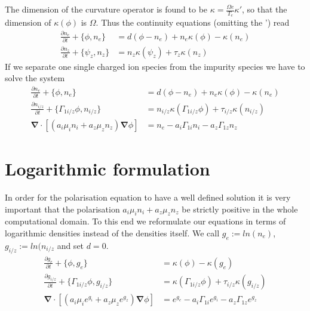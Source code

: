 \documentclass[a4paper,12pt]{scrartcl}
\renewcommand{\vec}[1]{{\mathbf{#1}}}
\begin{document}
The dimension of the curvature operator is found to be
$\kappa = \frac{\Omega e}{T_e}\kappa'$, 
so that the dimension of $\kappa(\phi)$ is $\Omega$.
Thus the continuity equations (omitting the ') read
\begin{subequations}
\begin{align}
    \frac{\partial n_e}{\partial t} + \{\phi, n_e\} &= d( \phi - n_e) + n_e\kappa(\phi) -
    \kappa(n_e) \\
    \frac{\partial n_z}{\partial t} + \{\psi_z, n_z\} &= n_z\kappa(\psi_z) +
    \tau_z\kappa(n_z) 
    \label{}
\end{align}
\end{subequations}
If we separate one single charged ion species from the impurity species we 
have to solve the system
\begin{subequations}
    \begin{align}
    \frac{\partial n_e}{\partial t} + \{\phi, n_e\} &= d( \phi - n_e) + n_e\kappa(\phi) -
    \kappa(n_e) \\
    \frac{\partial n_{i/z}}{\partial t} + \{\Gamma_{1i/z}\phi, n_{i/z}\} &= 
    n_{i/z}\kappa(\Gamma_{1i/z}\phi) + \tau_{i/z}\kappa(n_{i/z}) \\
    \vec \nabla\cdot\left[ (a_i \mu_i n_i + a_z \mu_z n_z)\vec \nabla \phi \right] &= 
        n_e - a_i\Gamma_{1i}n_i - a_z \Gamma_{1z} n_z
        \label{}
    \end{align}
    \label{}
\end{subequations}
\section{Logarithmic formulation}
In order for the polarisation equation to have a well defined solution it is very important 
that the polarisation $a_i\mu_i n_i + a_z\mu_zn_z$ be strictly positive in the whole 
computational domain. To this end we reformulate our equations in terms of logarithmic
densities instead of the densities itself. We call $g_e := ln(n_e)$, $g_{i/z} := ln(n_{i/z}$
and set $d=0$. 
\begin{subequations}
    \begin{align}
    \frac{\partial g_e}{\partial t} + \{\phi, g_e\} &= \kappa(\phi) - \kappa(g_e) \\
    \frac{\partial g_{i/z}}{\partial t} + \{\Gamma_{1i/z}\phi, g_{i/z}\} &= 
    \kappa(\Gamma_{1i/z}\phi) + \tau_{i/z}\kappa(g_{i/z}) \\
    \vec \nabla\cdot\left[ (a_i \mu_i e^{g_i} + a_z \mu_z e^{g_z})\vec \nabla \phi \right] &= 
        e^{g_e} - a_i\Gamma_{1i}e^{g_i} - a_z \Gamma_{1z} e^{g_z}
        \label{}
    \end{align}
    \label{}
\end{subequations}
\end{document}
